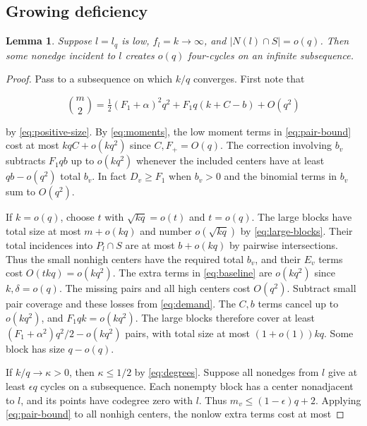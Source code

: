 \documentclass[11pt,reqno]{amsart}
\newtheorem{lemma}[theorem]{Lemma}
\theoremstyle{definition}
\theoremstyle{remark}
\numberwithin{equation}{section}
\begin{document}
\subsection{Growing deficiency}
\begin{lemma}\label{lem:growing}
Suppose \(l=l_q\) is low, \(f_l=k\to\infty\), and
\(|N(l)\cap S|=o(q)\). Then some nonedge incident to \(l\) creates
\(o(q)\) four-cycles on an infinite subsequence.
\end{lemma}
\begin{proof}

Pass to a subsequence on which \(k/q\) converges. First note that

\begin{equation}\label{eq:demand}
\binom m2=\tfrac12(F_1+\alpha)^2q^2+F_1q(k+C-b)+O(q^2)
\end{equation}

by \eqref{eq:positive-size}. By \eqref{eq:moments}, the low moment terms in \eqref{eq:pair-bound} cost at most \(kqC+o(kq^2)\) since \(C,F_+=O(q)\). The correction involving \(b_v\) subtracts \(F_1qb\) up to \(o(kq^2)\) whenever the included centers have at least \(qb-o(q^2)\) total \(b_v\). In fact \(D_v\ge F_1\) when \(b_v>0\) and the binomial terms in \(b_v\) sum to \(O(q^2)\).

If \(k=o(q)\), choose \(t\) with \(\sqrt{kq}=o(t)\) and \(t=o(q)\). The large blocks have total size at most \(m+o(kq)\) and number \(o(\sqrt{kq})\) by \eqref{eq:large-blocks}. Their total incidences into \(P_l\cap S\) are at most \(b+o(kq)\) by pairwise intersections. Thus the small nonhigh centers have the required total \(b_v\), and their \(E_v\) terms cost \(O(tkq)=o(kq^2)\). The extra terms in \eqref{eq:baseline} are \(o(kq^2)\) since \(k,\delta=o(q)\). The missing pairs and all high centers cost \(O(q^2)\). Subtract small pair coverage and these losses from \eqref{eq:demand}. The \(C,b\) terms cancel up to \(o(kq^2)\), and \(F_1qk=o(kq^2)\). The large blocks therefore cover at least \((F_1+\alpha^2)q^2/2-o(kq^2)\) pairs, with total size at most \((1+o(1))kq\). Some block has size \(q-o(q)\).

If \(k/q\to\kappa>0\), then \(\kappa\le1/2\) by \eqref{eq:degrees}. Suppose all nonedges from \(l\) give at least \(\epsilon q\) cycles on a subsequence. Each nonempty block has a center nonadjacent to \(l\), and its points have codegree zero with \(l\). Thus \(m_v\le(1-\epsilon)q+2\). Applying \eqref{eq:pair-bound} to all nonhigh centers, the nonlow extra terms cost at most


\end{proof}
\end{document}
